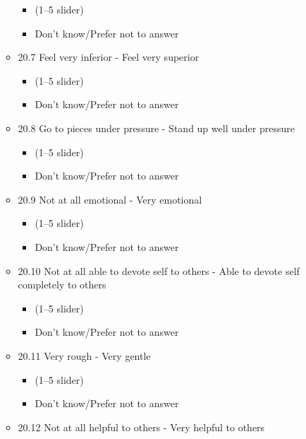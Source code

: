 \documentclass[
  letterpaper,
  DIV=11,
  numbers=noendperiod]{scrreprt}
\providecommand{\tightlist}{%
  \setlength{\itemsep}{0pt}\setlength{\parskip}{0pt}}\usepackage{longtable,booktabs,array}
\begin{document}
\begin{enumerate}
\begin{itemize}
    \begin{itemize}
    \tightlist
    \item
      (1--5 slider)
    \item
      Don't know/Prefer not to answer
    \end{itemize}
  \item
    20.7 Feel very inferior - Feel very superior

    \begin{itemize}
    \tightlist
    \item
      (1--5 slider)
    \item
      Don't know/Prefer not to answer
    \end{itemize}
  \item
    20.8 Go to pieces under pressure - Stand up well under pressure

    \begin{itemize}
    \tightlist
    \item
      (1--5 slider)
    \item
      Don't know/Prefer not to answer
    \end{itemize}
  \item
    20.9 Not at all emotional - Very emotional

    \begin{itemize}
    \tightlist
    \item
      (1--5 slider)
    \item
      Don't know/Prefer not to answer
    \end{itemize}
  \item
    20.10 Not at all able to devote self to others - Able to devote self
    completely to others

    \begin{itemize}
    \tightlist
    \item
      (1--5 slider)
    \item
      Don't know/Prefer not to answer
    \end{itemize}
  \item
    20.11 Very rough - Very gentle

    \begin{itemize}
    \tightlist
    \item
      (1--5 slider)
    \item
      Don't know/Prefer not to answer
    \end{itemize}
  \item
    20.12 Not at all helpful to others - Very helpful to others


\end{itemize}
\end{enumerate}
\end{document}
